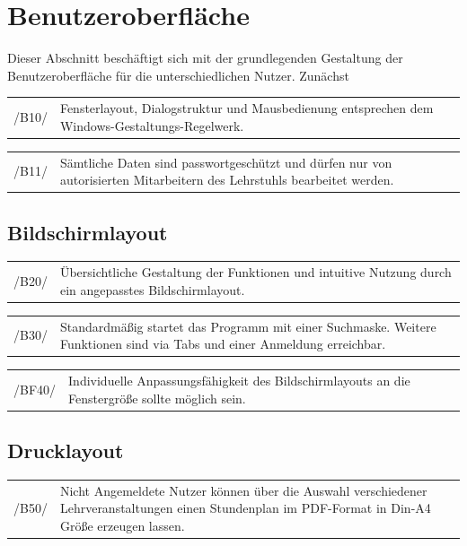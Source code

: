 \section{Benutzeroberfläche}
\label{sec:Benutzeroberfläche}


Dieser Abschnitt beschäftigt sich mit der grundlegenden Gestaltung der Benutzeroberfläche für die unterschiedlichen Nutzer. Zunächst


\begin{tabular}{p{1.5cm}p{14.5cm}}
 /B10/	& Fensterlayout, Dialogstruktur und Mausbedienung entsprechen dem Windows-Gestaltungs-Regelwerk. \\[0.25cm]	 
\end{tabular}

\begin{tabular}{p{1.5cm}p{14.5cm}}
 /B11/	& Sämtliche Daten sind passwortgeschützt und dürfen nur von autorisierten Mitarbeitern des Lehrstuhls bearbeitet werden. \\[0.25cm]	 
\end{tabular}


\subsection{Bildschirmlayout}

\begin{tabular}{p{1.5cm}p{14.5cm}}
 /B20/	& Übersichtliche Gestaltung der Funktionen und intuitive Nutzung durch ein angepasstes Bildschirmlayout. \\[0.25cm]	 
\end{tabular}

\begin{tabular}{p{1.5cm}p{14.5cm}}
 /B30/	& Standardmäßig startet das Programm mit einer Suchmaske. Weitere Funktionen sind via Tabs und einer Anmeldung erreichbar. \\[0.25cm]	 
\end{tabular}

\begin{tabular}{p{1.5cm}p{14.5cm}}
 /BF40/	& Individuelle Anpassungsfähigkeit des Bildschirmlayouts an die Fenstergröße sollte möglich sein. \\[0.25cm]	 
\end{tabular}

\subsection{Drucklayout}

\begin{tabular}{p{1.5cm}p{14.5cm}}
 /B50/	& Nicht Angemeldete Nutzer können über die Auswahl verschiedener Lehrveranstaltungen einen Stundenplan im PDF-Format in Din-A4 Größe erzeugen lassen. \\[0.25cm]	 
\end{tabular}

